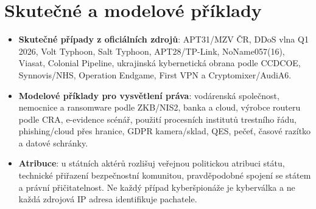 \section*{Skutečné a modelové příklady}
\begin{itemize}
  \item \textbf{Skutečné případy z oficiálních zdrojů}: APT31/MZV ČR, DDoS vlna Q1 2026, Volt Typhoon, Salt Typhoon, APT28/TP-Link, NoName057(16), Viasat, Colonial Pipeline, ukrajinská kybernetická obrana podle CCDCOE, Synnovis/NHS, Operation Endgame, First VPN a Cryptomixer/AudiA6.
  \item \textbf{Modelové příklady pro vysvětlení práva}: vodárenská společnost, nemocnice a ransomware podle ZKB/NIS2, banka a cloud, výrobce routeru podle CRA, e-evidence scénář, použití procesních institutů trestního řádu, phishing/cloud přes hranice, GDPR kamera/sklad, QES, pečeť, časové razítko a datové schránky.
  \item \textbf{Atribuce}: u státních aktérů rozlišuj veřejnou politickou atribuci státu, technické přiřazení bezpečnostní komunitou, pravděpodobné spojení se státem a právní přičitatelnost. Ne každý případ kyberšpionáže je kyberválka a ne každá zdrojová IP adresa identifikuje pachatele.
\end{itemize}

